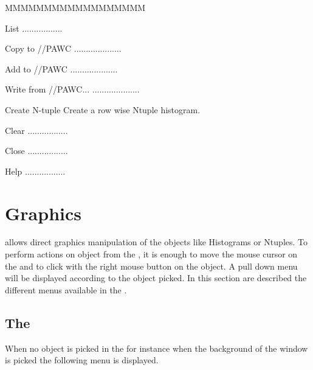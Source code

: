 \begin{DLsf}{MMMMMMMMMMMMMMMMMM}
\item[List]         .................
\item[Copy to //PAWC]   ....................
\item[Add to //PAWC]   ....................
\item[Write from //PAWC...]   ....................
\item[Create N-tuple] Create a row wise Ntuple histogram.
\item[Clear]  .................
\item[Close]  .................
\item[Help]  .................
\end{DLsf}

\newpage
\mbox{}
\newpage

\section{Graphics}
\PAWPP{} allows direct graphics manipulation of the objects like Histograms
or Ntuples. To perform actions on object from the \GW, it is
enough to move the mouse cursor on the \GW{} and to click with the
right mouse button on the object. A pull down menu will be displayed according
to the object picked. In this section are described the different menus
available in the \GW.


\newpage

\subsection{The \GW}
When no object is picked in the \GW{} for instance when the
background of the window is picked the following menu is displayed.

